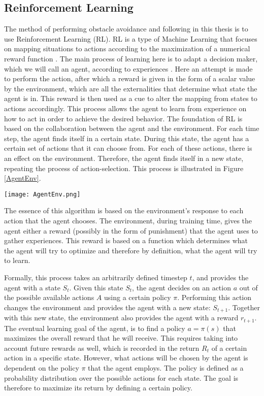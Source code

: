 \subsection{Reinforcement Learning}
The method of performing obstacle avoidance and following in this thesis
is to use Reinforcement Learning (RL). RL is a type of Machine Learning that 
focuses on mapping situations to actions according to the maximization of a 
numerical reward function \cite{RLBook}. The main process of learning here is to 
adapt a decision maker, which we will call an agent, according to experiences \cite{rainbowrl}. 
Here an attempt is made to perform the action, after which a reward is given in 
the form of a scalar value by the environment, which are all the externalities 
that determine what state the agent is in. This reward is then used as a cue  
to alter the mapping from states to actions accordingly. This process allows 
the agent to learn from experience on how to act in order to achieve the desired 
behavior. The foundation of RL is based on the collaboration between the agent 
and the environment. For each time step, the agent 
finds itself in a certain state. During this state, the agent has a certain set 
of actions that it can choose from. For each of these actions, there 
is an effect on the environment. Therefore, the agent finds itself 
in a new state, repeating the process of action-selection. This process is 
illustrated in Figure \ref{AgentEnv}. 

\begin{Figure}
    \centering
    \texttt{[image: AgentEnv.png]}
    \label{AgentEnv}
\end{Figure}

The essence of this algorithm is based on the environment's response to each 
action that the agent chooses. The environment, during training time, gives 
the agent either a reward (possibly in the form of punishment) that the agent 
uses to gather experiences. This reward is based on a function which 
determines what the agent will try to optimize and therefore by definition, what the 
agent will try to learn. 

Formally, this process takes an arbitrarily defined timestep $t$, and provides
the agent with a state $S_t$. Given this state $S_t$, the agent decides on 
an action $a$ out of the possible available actions $A$ using a certain policy $\pi$.
Performing this action changes the environment and provides the agent with a 
new state: $S_{t+1}$. Together with this new state, the environment also 
provides the agent with a reward $r_{t+1}$. The eventual learning goal of the agent,
is to find a policy $a = \pi(s)$ that maximizes the overall reward that he will
receive. This requires taking into account future rewards as well, which is 
recorded in the return $R_t$ of a certain action in a specific state. 
However, what actions will be chosen by the agent is dependent on the policy $\pi$
that the agent employs. The policy is defined as a probability distribution over
the possible actions for each state. The goal is therefore to maximize its 
return by defining a certain policy. 

